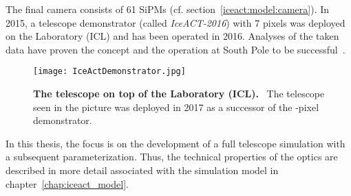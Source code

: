 The final \iceact camera consists of \num{61} SiPMs (cf. section~\ref{iceact:model:camera}). In 2015, a telescope demonstrator (called \textit{IceACT-2016}) with 7 pixels was deployed on the \icecube Laboratory (ICL) and has been operated in 2016. Analyses of the taken data have proven the concept and the operation at South Pole to be successful~\cite{iceact:erik}.\\

\begin{figure}[H]
	\centering
	\texttt{[image: IceActDemonstrator.jpg]}
	\caption[The \iceact telescope on top of the \icecube Laboratory (ICL)]{\textbf{The \iceact telescope on top of the \icecube Laboratory (ICL).}~\cite{iceact:picture} The telescope seen in the picture was deployed in 2017 as a successor of the -pixel demonstrator.}
	\label{iceact:picture}
\end{figure}

In this thesis, the focus is on the development of a full telescope simulation with a subsequent parameterization. Thus, the technical properties of the \iceact optics are described in more detail associated with the simulation model in chapter~\ref{chap:iceact_model}. 